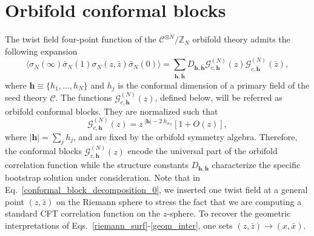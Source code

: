 \documentclass[a4paper,11pt]{article}
\begin{document}
\section{Orbifold conformal blocks}\label{sec:conf_blocks}
The twist field four-point function of the $\mathcal{C}^{\otimes N}/\mathbb{Z}_N$ orbifold 
theory admits the following expansion
\begin{equation}\label{conformal_block_decomposition_0}
 \langle \sigma_N (\infty)  \bar{\sigma}_N(1) \sigma_N (z, \bar{z})\bar{\sigma}_N(0)\rangle=
 \sum_{\boldsymbol{h},\boldsymbol{\bar{h}}} D_{\boldsymbol{h}, \boldsymbol{\bar{h}}}
 \mathcal{G}_{c, \boldsymbol{h}}^{(N)}(z)\mathcal{G}_{c,\boldsymbol{\bar{h}}}^{(N)}(\bar{z}),
\end{equation}
where $\boldsymbol{h}\equiv\{h_1, \dots, h_N\}$ and $h_j$ is the conformal dimension of  
a primary field of the seed theory $\mathcal{C}$. The functions $\mathcal{G}_{c, \boldsymbol{h}}^{(N)}(z)$, 
defined below, will be referred as orbifold conformal blocks. They are normalized such that
\begin{equation}
\label{G_asy}
\mathcal{G}_{c, \boldsymbol{h}}^{(N)}(z)=z^{\;|\boldsymbol{h}| -2\; h_{\sigma_N}}\left[1+ O(z)\right],
\end{equation}
where $|\boldsymbol{h}|=\sum_j h_j$, and are fixed by the orbifold symmetry algebra. Therefore, the conformal blocks $\mathcal{G}_{c, \boldsymbol{h}}^{(N)}(z)$ encode the universal part of the orbifold correlation function  while  the structure constants  $D_{\boldsymbol{h}, \boldsymbol{\bar{h}}}$  characterize the specific bootstrap solution under consideration. Note that in Eq.~\eqref{conformal_block_decomposition_0}, we inserted one twist field at a general point $(z,\bar{z})$ on the Riemann sphere to stress the fact that we are computing a standard CFT correlation function on the $z$-sphere. To recover the geometric interpretations of Eqs.~\eqref{riemann_surf}-\eqref{geom_inter}, one sets $(z,\bar{z})\to (x,\bar{x})$.
\end{document}
